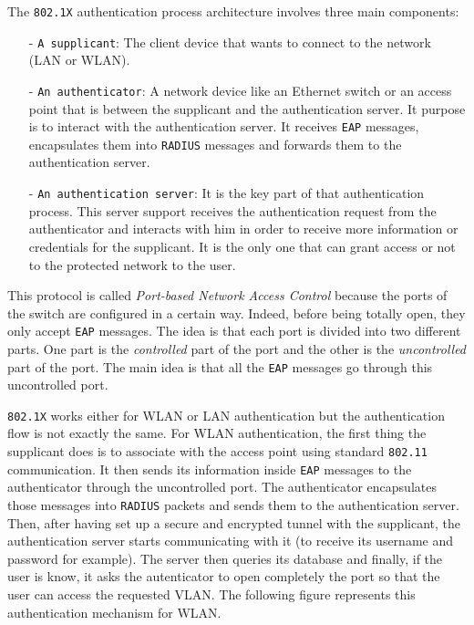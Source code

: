 The \texttt{802.1X} authentication process architecture involves three main components:
\begin{itemize}
	\item[-]\texttt{A supplicant}: The client device that wants to connect to the network (LAN or WLAN).
	\item[-]\texttt{An authenticator}: A network device like an Ethernet switch or an access point that is between the supplicant and the authentication server. It purpose is to interact with the authentication server. It receives \texttt{EAP} messages, encapsulates them into \texttt{RADIUS} messages and forwards them to the authentication server.
	\item[-]\texttt{An authentication server}: It is the key part of that authentication process. This server support receives the authentication request from the authenticator and interacts with him in order to receive more information or credentials for the supplicant. It is the only one that can grant access or not to the protected network to the user.
\end{itemize} 

This protocol is called \textit{Port-based Network Access Control} because the ports of the switch are configured in a certain way. Indeed, before being totally open, they only accept \texttt{EAP} messages. The idea is that each port is divided into two different parts. One part is the \textit{controlled} part of the port and the other is the \textit{uncontrolled} part of the port. The main idea is that all the \texttt{EAP} messages go through this uncontrolled port.

\texttt{802.1X} works either for WLAN or LAN authentication but the authentication flow is not exactly the same.
For WLAN authentication, the first thing the supplicant does is to associate with the access point using standard \texttt{802.11} communication. It then sends its information inside \texttt{EAP} messages to the authenticator through the uncontrolled port. The authenticator encapsulates those messages into \texttt{RADIUS} packets and sends them to the authentication server. Then, after having set up a secure and encrypted tunnel with the supplicant, the authentication server starts communicating with it (to receive its username and password for example). The server then queries its database and finally, if the user is know, it asks the autenticator to open completely the port so that the user can access the requested VLAN.
The following figure represents this authentication mechanism for WLAN.

